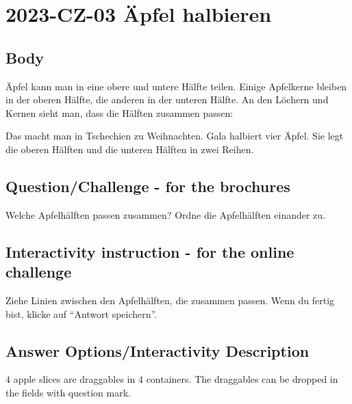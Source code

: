 \documentclass[a4paper,11pt]{report}
\newcommand{\taskGraphicsFolder}{..}
\begin{document}
\section*{\centering{} 2023-CZ-03 Äpfel halbieren}


\subsection*{Body}

Äpfel kann man in eine obere und untere Hälfte teilen.
Einige Apfelkerne bleiben in der oberen Hälfte, die anderen in der unteren Hälfte.
An den Löchern und Kernen sieht man, dass die Hälften zusammen passen:

{\centering%
\par}

Das macht man in Tschechien zu Weihnachten. Gala halbiert vier Äpfel.
Sie legt die oberen Hälften und die unteren Hälften in zwei Reihen.

{\em


\subsection*{Question/Challenge - for the brochures}

Welche Apfelhälften passen zusammen? Ordne die Apfelhälften einander zu.

{\centering%
\par}

}


\subsection*{Interactivity instruction - for the online challenge}

Ziehe Linien zwischen den Apfelhälften, die zusammen passen. Wenn du fertig bist, klicke auf \enquote{Antwort speichern}.

\begingroup
\renewcommand{\arraystretch}{1.5}
\subsection*{Answer Options/Interactivity Description}

$4$ apple slices are draggables in $4$ containers. The draggables can be dropped in the fields with question mark.
\end{document}
